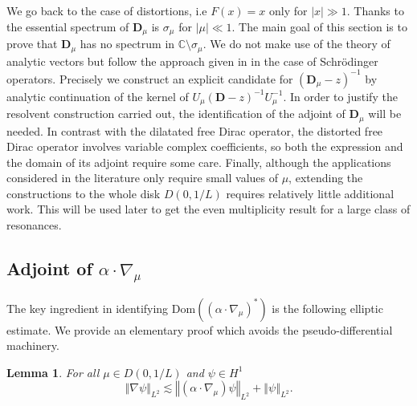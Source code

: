 \documentclass[a4paper, 12pt]{amsart}
\numberwithin{equation}{section}
\newtheorem{lemma}{Lemma}[section]
\newcommand{\C}{\mathbb{C}} %
\newcommand{\lv}{\left\vert} %
\newcommand{\rv}{\right\vert} %
\newcommand{\lV}{\left\Vert} %
\newcommand{\rV}{\right\Vert} %
\newcommand{\Dvec}{\mathbf{D}}
\newcommand{\Dom}{\mathrm{Dom}} %
\begin{document}
We go back to the case of distortions, i.e $F(x)=x$ only for $\lv x\rv\gg 1$. Thanks to \cite{Kh07} the essential spectrum of $\Dvec_\mu$ is $\sigma_\mu$ for $\lv\mu\rv\ll1$. The main goal of this section is to prove that $\Dvec_\mu$ has no spectrum in $\C\setminus\sigma_\mu$. We do not make use of the theory of analytic vectors but follow the approach given in \cite{DyZw19} in the case of Schrödinger operators. Precisely we construct an explicit candidate for $(\Dvec_\mu-z)^{-1}$ by analytic continuation of the kernel of $U_\mu(\Dvec-z)^{-1}U_\mu^{-1}$. In order to justify the resolvent construction carried out, the identification of the adjoint of $\Dvec_\mu$ will be needed. In contrast with the dilatated free Dirac operator, the distorted free Dirac operator involves variable complex coefficients, so both the expression and the domain of its adjoint require some care. Finally, although the applications considered in the literature only require small values of $\mu$, extending the constructions to the whole disk $D(0,1/L)$ requires relatively little additional work. This will be used later to get the even multiplicity result for a large class of resonances.

\subsection*{Adjoint of $\alpha\cdot\nabla_\mu$} The key ingredient in identifying $\Dom((\alpha\cdot\nabla_\mu)^*)$ is the following elliptic estimate. We provide an elementary proof which avoids the pseudo-differential machinery.

\begin{lemma}\label{Ellipticity}
    For all $\mu\in D(0,1/L)$ and $\psi\in H^1$
    \[\lV \nabla\psi\rV_{L^2}\lesssim\lV(\alpha\cdot\nabla_\mu)\psi\rV_{L^2}+\lV\psi\rV_{L^2}.\]
\end{lemma}
\end{document}
